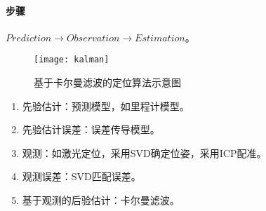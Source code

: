 \documentclass[
12pt, %
a4paper, 
oneside, %
headinclude,footinclude, %
]{scrartcl}
\begin{document}
\paragraph{步骤}
$ Prediction \rightarrow Observation \rightarrow Estimation $。

\begin{figure}[H]
\centering 
\texttt{[image: kalman]} 
\caption{基于卡尔曼滤波的定位算法示意图}
\end{figure}

\begin{enumerate}
\item 先验估计：预测模型，如里程计模型。
\item 先验估计误差：误差传导模型。
\item 观测：如激光定位，采用SVD确定位姿，采用ICP配准。
\item 观测误差：SVD匹配误差。
\item 基于观测的后验估计：卡尔曼滤波。
\end{enumerate}
\end{document}
